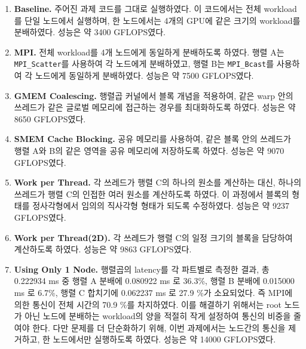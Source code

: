 \begin{itemize}
{        \begin{enumerate}
            \item {
                \textbf{Baseline.} 주어진 과제 코드를 그대로 실행하였다.
                이 코드에서는 전체 workload를 단일 노드에서 실행하며, 한 노드에서는 4개의 GPU에
                같은 크기의 workload를 분배하였다. 성능은 약 3400 GFLOPS였다.
            }
            \item {
                \textbf{MPI.} 전체 workload를 4개 노드에게 동일하게 분배하도록 하였다.
                행렬 A는 \texttt{MPI\_Scatter}를 사용하여 각 노드에게 분배하였고,
                행렬 B는 \texttt{MPI\_Bcast}를 사용하여 각 노드에게 동일하게 분배하였다.
                성능은 약 7500 GFLOPS였다.
            }
            \item {
                \textbf{GMEM Coalescing.} 행렬곱 커널에서 블록 개념을 적용하여, 같은 warp 안의 쓰레드가
                같은 글로벌 메모리에 접근하는 경우를 최대화하도록 하였다. 성능은 약 8650 GFLOPS였다.
            }
            \item {
                \textbf{SMEM Cache Blocking.} 공유 메모리를 사용하여, 같은 블록 안의 쓰레드가
                행렬 A와 B의 같은 영역을 공유 메모리에 저장하도록 하였다. 성능은 약 9070 GFLOPS였다.
            }
            \item {
                \textbf{Work per Thread.} 각 쓰레드가 행렬 C의 하나의 원소를 계산하는 대신,
                하나의 쓰레드가 행렬 C의 인접한 여러 원소를 계산하도록 하였다. 이 과정에서 블록의 형태를
                정사각형에서 임의의 직사각형 형태가 되도록 수정하였다. 성능은 약 9237 GFLOPS였다.
            }
            \item {
                \textbf{Work per Thread(2D).} 각 쓰레드가 행렬 C의 일정 크기의 블록을 담당하여 계산하도록 하였다.
                성능은 약 9863 GFLOPS였다.
            }
            \item {
                \textbf{Using Only 1 Node.} 행렬곱의 latency를 각 파트별로 측정한 결과, 총 0.222934 ms 중
                행렬 A 분배에 0.080922 ms 로 36.3\%, 행렬 B 분배에 0.015000 ms 로 6.7\%,
                행렬 C 합치기에 0.062237 ms 로 27.9 \%가 소요되었다. 즉 MPI에 의한 통신이 전체 시간의
                70.9 \%를 차지하였다. 이를 해결하기 위해서는 root 노드가 아닌 노드에 분배하는 workload의 양을
                적절히 작게 설정하여 통신의 비중을 줄여야 한다. 다만 문제를 더 단순화하기 위해, 이번 과제에서는
                노드간의 통신을 제거하고, 한 노드에서만 실행하도록 하였다. 성능은 약 14000 GFLOPS였다.
            }

\end{enumerate}}
\end{itemize}
